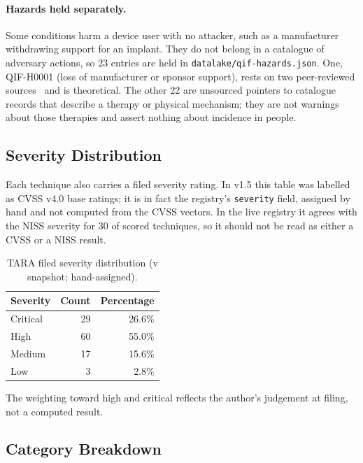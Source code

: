 \paragraph{Hazards held separately.} Some conditions harm a device user with no attacker,
such as a manufacturer withdrawing support for an implant. They do not belong in a catalogue
of adversary actions, so 23 entries are held in \texttt{datalake/qif-hazards.json}. One,
QIF-H0001 (loss of manufacturer or sponsor support), rests on two peer-reviewed
sources~\cite{higgins2026posttrial,zhao2026consentinflux} and is theoretical. The other 22 are unsourced pointers
to catalogue records that describe a therapy or physical mechanism; they are not warnings
about those therapies and assert nothing about incidence in people.

\subsection{Severity Distribution}

Each technique also carries a filed severity rating. In v1.5 this table was labelled as
CVSS v4.0 base ratings; it is in fact the registry's \texttt{severity} field, assigned by
hand and not computed from the CVSS vectors. In the live registry it agrees with the NISS
severity for 30 of \LiveNissScored{} scored techniques, so it should not be read as either
a CVSS or a NISS result.

\begin{table}[H]
\centering
\caption{TARA filed severity distribution (v\SnapshotRegistryVersion{} snapshot; hand-assigned).}
\label{tab:severity}
\small
\begin{tabular}{@{}l r r@{}}
\toprule
\textbf{Severity} & \textbf{Count} & \textbf{Percentage} \\
\midrule
Critical & 29 & 26.6\% \\
High     & 60 & 55.0\% \\
Medium   & 17 & 15.6\% \\
Low      &  3 &  2.8\% \\
\bottomrule
\end{tabular}
\end{table}

The weighting toward high and critical reflects the author's judgement at filing, not a
computed result.

\subsection{Category Breakdown}

